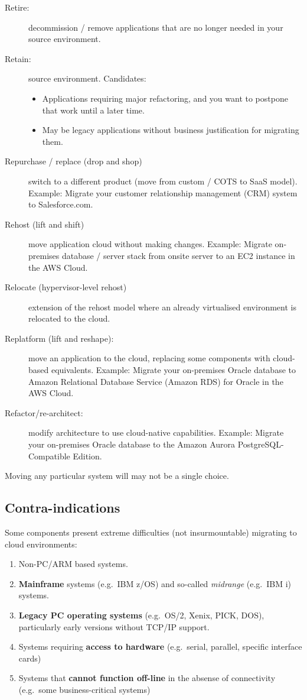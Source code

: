 \documentclass[slides]{pgnotes}
\begin{document}
\begin{description}
\item[Retire:]
decommission / remove applications that are no longer needed in your
source environment.
\item[Retain:]
source environment. Candidates:

\begin{itemize}
\item
  Applications requiring major refactoring, and you want to postpone
  that work until a later time.
\item
  May be legacy applications without business justification for
  migrating them.
\end{itemize}
\item[Repurchase / replace (drop and shop)]
switch to a different product (move from custom / COTS to SaaS model).
Example: Migrate your customer relationship management (CRM) system to
Salesforce.com.
\item[Rehost (lift and shift)]
move application cloud without making changes. Example: Migrate
on-premises database / server stack from onsite server to an EC2
instance in the AWS Cloud.
\item[Relocate (hypervisor-level rehost)]
extension of the rehost model where an already virtualised environment
is relocated to the cloud.
\item[Replatform (lift and reshape):]
move an application to the cloud, replacing some components with
cloud-based equivalents. Example: Migrate your on-premises Oracle
database to Amazon Relational Database Service (Amazon RDS) for Oracle
in the AWS Cloud.
\item[Refactor/re-architect:]
modify architecture to use cloud-native capabilities. Example: Migrate
your on-premises Oracle database to the Amazon Aurora
PostgreSQL-Compatible Edition.
\end{description}

Moving any particular system will may not be a single choice.

\subsection{Contra-indications}\label{contra-indications}

Some components present extreme difficulties (not insurmountable)
migrating to cloud environments:

\begin{enumerate}
\def\labelenumi{\arabic{enumi}.}
\item
  Non-PC/ARM based systems.
\item
  \textbf{Mainframe} systems (e.g.~IBM z/OS) and so-called
  \emph{midrange} (e.g.~IBM i) systems.
\item
  \textbf{Legacy PC operating systems} (e.g.~OS/2, Xenix, PICK, DOS),
  particularly early versions without TCP/IP support.
\item
  Systems requiring \textbf{access to hardware} (e.g.~serial, parallel,
  specific interface cards)
\item
  Systems that \textbf{cannot function off-line} in the absense of
  connectivity (e.g.~some business-critical systems)
\end{enumerate}
\end{document}
